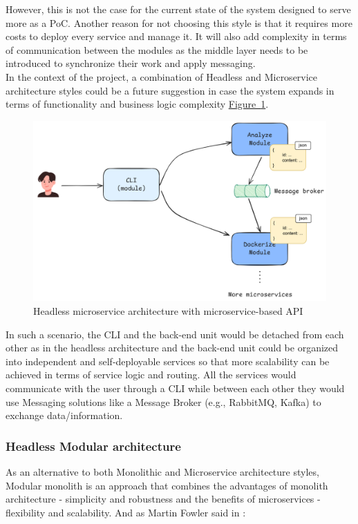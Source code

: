 \documentclass[twocolumn]{article}
\newcommand{\FigRef}[1]{\hyperref[#1]{Figure~\ref{#1}}}
\begin{document}
However, this is not the case for the current state of the system designed to serve more as a PoC. Another reason for not choosing this style is that it requires more costs to deploy every service and manage it. It will also add complexity in terms of communication between the modules as the middle layer needs to be introduced to synchronize their work and apply messaging. \\

In the context of the project, a combination of Headless and Microservice architecture styles could be a future suggestion in case the system expands in terms of functionality and business logic complexity \FigRef{fig:headless-microservice-architecture}. 

\begin{figure}[H]
    \centering
    \includegraphics[width=\linewidth]{images/headless-microservice-architecture.png}
    \caption{Headless microservice architecture with microservice-based API}
    \label{fig:headless-microservice-architecture}
\end{figure}

In such a scenario, the CLI and the back-end unit would be detached from each other as in the headless architecture and the back-end unit could be organized into independent and self-deployable services so that more scalability can be achieved in terms of service logic and routing. All the services would communicate with the user through a CLI while between each other they would use Messaging solutions like a Message Broker (e.g., RabbitMQ, Kafka) to exchange data/information.

\subsubsection{Headless Modular architecture}
As an alternative to both Monolithic and Microservice architecture styles, Modular monolith is an approach that combines the advantages of monolith architecture - simplicity and robustness and the benefits of microservices - flexibility and scalability. And as Martin Fowler said in \cite{Fowler-2015}: 
\end{document}

